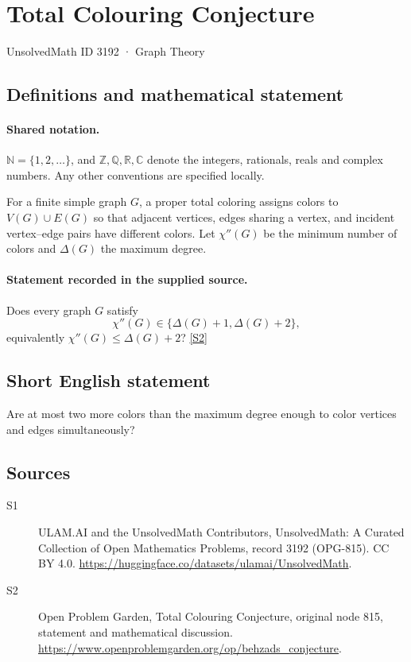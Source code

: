 \documentclass[11pt]{article}
\newcommand{\sref}[2]{\hyperlink{source:#1:#2}{[S#2]}}
\begin{document}
\setcounter{section}{3191}
\section{Total Colouring Conjecture}\label{3192}
{\small\sffamily UnsolvedMath ID 3192 · Graph Theory}
\subsection{Definitions and mathematical statement}

\paragraph{Shared notation.}$\mathbb N=\{1,2,\ldots\}$, and $\mathbb Z,\mathbb Q,\mathbb R,\mathbb C$ denote the integers, rationals, reals and complex numbers. Any other conventions are specified locally.


For a finite simple graph $G$, a proper total coloring assigns colors to $V(G)\cup E(G)$ so that adjacent vertices, edges sharing a vertex, and incident vertex--edge pairs have different colors. Let $\chi''(G)$ be the minimum number of colors and $\Delta(G)$ the maximum degree.
\paragraph{Statement recorded in the supplied source.}
Does every graph $G$ satisfy \[\chi''(G)\in\{\Delta(G)+1,\Delta(G)+2\},\] equivalently $\chi''(G)\le\Delta(G)+2$? \sref{3192}{2}
\subsection{Short English statement}
Are at most two more colors than the maximum degree enough to color vertices and edges simultaneously?
\subsection{Sources}
\begin{description}
\item[\hypertarget{source:3192:1}{S1}] ULAM.AI and the UnsolvedMath Contributors, UnsolvedMath: A Curated Collection of Open Mathematics Problems, record 3192 (OPG-815). CC BY 4.0. \url{https://huggingface.co/datasets/ulamai/UnsolvedMath}.
\item[\hypertarget{source:3192:2}{S2}] Open Problem Garden, Total Colouring Conjecture, original node 815, statement and mathematical discussion. \url{https://www.openproblemgarden.org/op/behzads_conjecture}.
\end{description}
\label{end:3192}
\end{document}
